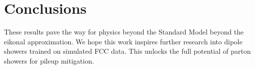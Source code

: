 \section{Conclusions}\label{sec:conclusions}

These results pave the way for physics beyond the Standard Model beyond
the eikonal approximation. We hope this work inspires further research
into dipole showers trained on simulated FCC data. This unlocks the full
potential of parton showers for pileup mitigation.

